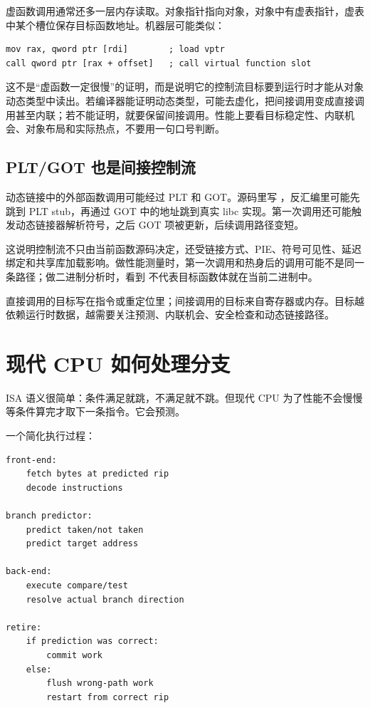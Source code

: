 虚函数调用通常还多一层内存读取。对象指针指向对象，对象中有虚表指针，虚表中某个槽位保存目标函数地址。机器层可能类似：

\begin{lstlisting}
mov rax, qword ptr [rdi]        ; load vptr
call qword ptr [rax + offset]   ; call virtual function slot
\end{lstlisting}

这不是“虚函数一定很慢”的证明，而是说明它的控制流目标要到运行时才能从对象动态类型中读出。若编译器能证明动态类型，可能去虚化，把间接调用变成直接调用甚至内联；若不能证明，就要保留间接调用。性能上要看目标稳定性、内联机会、对象布局和实际热点，不要用一句口号判断。

\subsection{PLT/GOT 也是间接控制流}

动态链接中的外部函数调用可能经过 PLT 和 GOT。源码里写 ，反汇编里可能先跳到 PLT stub，再通过 GOT 中的地址跳到真实 libc 实现。第一次调用还可能触发动态链接器解析符号，之后 GOT 项被更新，后续调用路径变短。

这说明控制流不只由当前函数源码决定，还受链接方式、PIE、符号可见性、延迟绑定和共享库加载影响。做性能测量时，第一次调用和热身后的调用可能不是同一条路径；做二进制分析时，看到  不代表目标函数体就在当前二进制中。

\begin{keyidea}
直接调用的目标写在指令或重定位里；间接调用的目标来自寄存器或内存。目标越依赖运行时数据，越需要关注预测、内联机会、安全检查和动态链接路径。
\end{keyidea}

\section{现代 CPU 如何处理分支}

ISA 语义很简单：条件满足就跳，不满足就不跳。但现代 CPU 为了性能不会慢慢等条件算完才取下一条指令。它会预测。

一个简化执行过程：

\begin{lstlisting}
front-end:
    fetch bytes at predicted rip
    decode instructions

branch predictor:
    predict taken/not taken
    predict target address

back-end:
    execute compare/test
    resolve actual branch direction

retire:
    if prediction was correct:
        commit work
    else:
        flush wrong-path work
        restart from correct rip
\end{lstlisting}

